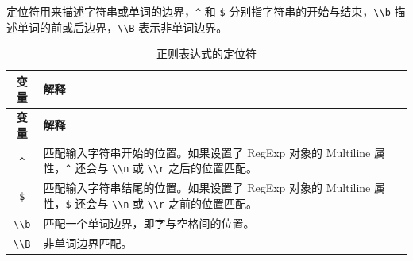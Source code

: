 \documentclass[doctor,openright,twoside]{sjtuthesis}
\newcommand{\passthrough}[1]{#1}
\theoremstyle{plain}
\theoremstyle{definition}
\theoremstyle{remark}
\theoremstyle{ocrenumbox}
\theoremstyle{plain}
\begin{document}
定位符用来描述字符串或单词的边界，\passthrough{\lstinline!^!} 和
\passthrough{\lstinline!$!}
分别指字符串的开始与结束，\passthrough{\lstinline!\\b!}
描述单词的前或后边界，\passthrough{\lstinline!\\B!} 表示非单词边界。

\begin{longtable}[]{@{}cl@{}}
\caption{正则表达式的定位符}\tabularnewline
\toprule
\begin{minipage}[b]{0.23\columnwidth}\centering
\textbf{变量}\strut
\end{minipage} & \begin{minipage}[b]{0.72\columnwidth}\raggedright
\textbf{解释}\strut
\end{minipage}\tabularnewline
\midrule
\endfirsthead
\toprule
\begin{minipage}[b]{0.23\columnwidth}\centering
\textbf{变量}\strut
\end{minipage} & \begin{minipage}[b]{0.72\columnwidth}\raggedright
\textbf{解释}\strut
\end{minipage}\tabularnewline
\midrule
\endhead
\begin{minipage}[t]{0.23\columnwidth}\centering
\passthrough{\lstinline!^!}\strut
\end{minipage} & \begin{minipage}[t]{0.72\columnwidth}\raggedright
匹配输入字符串开始的位置。如果设置了 RegExp 对象的 Multiline
属性，\passthrough{\lstinline!^!} 还会与 \passthrough{\lstinline!\\n!}
或 \passthrough{\lstinline!\\r!} 之后的位置匹配。\strut
\end{minipage}\tabularnewline
\begin{minipage}[t]{0.23\columnwidth}\centering
\passthrough{\lstinline!$!}\strut
\end{minipage} & \begin{minipage}[t]{0.72\columnwidth}\raggedright
匹配输入字符串结尾的位置。如果设置了 RegExp 对象的 Multiline
属性，\passthrough{\lstinline!$!} 还会与 \passthrough{\lstinline!\\n!}
或 \passthrough{\lstinline!\\r!} 之前的位置匹配。\strut
\end{minipage}\tabularnewline
\begin{minipage}[t]{0.23\columnwidth}\centering
\passthrough{\lstinline!\\b!}\strut
\end{minipage} & \begin{minipage}[t]{0.72\columnwidth}\raggedright
匹配一个单词边界，即字与空格间的位置。\strut
\end{minipage}\tabularnewline
\begin{minipage}[t]{0.23\columnwidth}\centering
\passthrough{\lstinline!\\B!}\strut
\end{minipage} & \begin{minipage}[t]{0.72\columnwidth}\raggedright
非单词边界匹配。\strut
\end{minipage}\tabularnewline
\bottomrule
\end{longtable}
\end{document}
